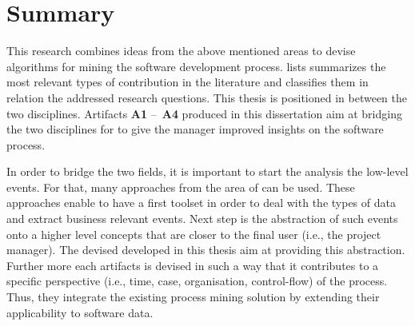 \section{Summary}
\label{sec:ch2-summary}

%
%
This research combines ideas from the above mentioned areas to devise algorithms for mining the software development process.  lists summarizes the most relevant types of contribution in the literature and classifies them in relation the addressed research questions. This thesis is positioned in between the two disciplines. Artifacts \textbf{A1} – \textbf{A4} produced in this dissertation aim at bridging the two disciplines for to give the manager improved insights on the software process.
%	


In order to bridge the two fields, it is important to start the analysis the low-level events. For that, many approaches from the area of  can be used. These approaches enable to have a first toolset in order to deal with the types of data and extract business relevant events. Next step is the abstraction of such events onto a higher level concepts that are closer to the final user (i.e., the project manager). The devised developed in this thesis aim at providing this abstraction. Further more each artifacts is devised in such a way that it contributes to a specific perspective (i.e., time, case, organisation, control-flow) of the process. Thus, they integrate the existing process mining solution by extending their applicability to software data. 


